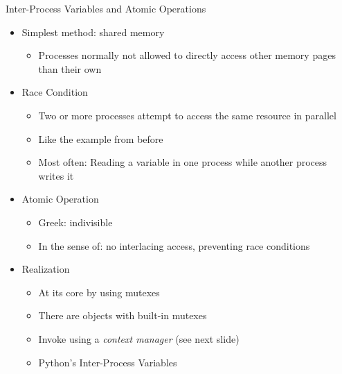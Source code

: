 
\begin{frame}{Inter-Process Variables and Atomic Operations}
%
\begin{itemize}
\item Simplest method: shared memory
	\begin{itemize}
	\item Processes normally not allowed to directly access other memory pages than their own
	\end{itemize}
\item Race Condition
	\begin{itemize}
	\item Two or more processes attempt to access the same resource in parallel
	\item Like the example from before
	\item Most often: Reading a variable in one process while another process writes it
	\end{itemize}
\item Atomic Operation
	\begin{itemize}
	\item Greek: indivisible
	\item In the sense of: no interlacing access, preventing race conditions
	\end{itemize}
\item Realization
	\begin{itemize}
	\item At its core by using mutexes
	\item There are objects with built-in mutexes
	\item Invoke using a \emph{context manager} (see next slide)
	\item[\Thus] Python's Inter-Process Variables
	\end{itemize}
\end{itemize}
%
\end{frame}


